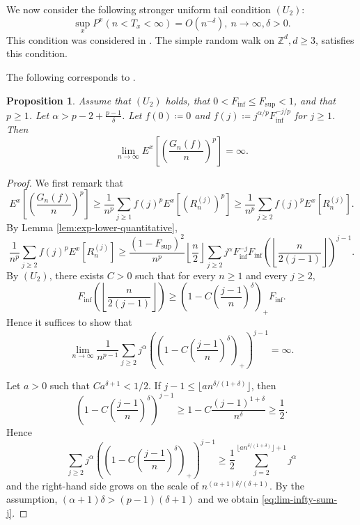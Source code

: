 \documentclass[a4paper, reqno, 11pt]{amsart}
\newtheorem{Prop}[Thm]{Proposition}
\theoremstyle{definition}
\begin{document}
We now consider the following stronger uniform tail  condition $(U_2)$: 
\[ \sup_{x} P^x (n < T_x < \infty) = O(n^{-\delta}), \ n \to \infty, \delta > 0. \]
This condition was considered in \cite[Proposition 5.7]{KN2018}. 
The simple random walk on $\mathbb{Z}^d, d \ge 3$, satisfies this condition. 

The following corresponds to \cite[Remark 3]{CCMP2026}. 
\begin{Prop}\label{prop:Lp-explode}
Assume that $(U_2)$ holds, that $0 < F_{\inf} \le F_{\sup} < 1$, and that $p \ge 1$. 
Let  $\alpha > p-2 + \frac{p-1}{\delta}$. 
Let $f(0) \coloneqq 0$ and $f(j) \coloneqq j^{\alpha/p} F_{\inf}^{- j/p}$ for $j \ge 1$. 
Then 
\[ \lim_{n \to \infty} E^x \left[ \left( \frac{G_n (f)}{n} \right)^p \right] = \infty. \]
\end{Prop}


\begin{proof}
We first remark that 
\[ E^x \left[ \left( \frac{G_n (f)}{n} \right)^p \right] \ge \frac{1}{n^p} \sum_{j \ge 1} f(j)^p E^x \left[\left(R_n^{(j)}\right)^p\right] \ge \frac{1}{n^p} \sum_{j \ge 2} f(j)^p E^x \left[R_n^{(j)}\right]. \]
By Lemma \ref{lem:exp-lower-quantitative}, 
\[ \frac{1}{n^p} \sum_{j \ge 2} f(j)^p E^x \left[R_n^{(j)}\right] \ge \frac{(1-F_{\sup})^2}{n^p}   \left\lfloor \frac{n}{2} \right\rfloor \sum_{j \ge 2}  j^{\alpha} F_{\inf}^{-j} F_{\inf}\left( \left\lfloor \frac{n}{2(j-1)} \right\rfloor\right)^{j-1}. \]
By  $(U_2)$, 
there exists $C > 0$ such that for every $n \ge 1$ and every $j \ge 2$, 
\[ F_{\inf}\left( \left\lfloor \frac{n}{2(j-1)} \right\rfloor\right) \ge  \left(1 - C \left(\frac{j-1}{n}\right)^{\delta}\right)_{+}  F_{\inf}. \]
Hence it suffices to show that 
\begin{equation}\label{eq:lim-infty-sum-j}
\lim_{n \to \infty} \frac{1}{n^{p-1}} \sum_{j \ge 2} j^{\alpha} \left(\left(1 - C \left(\frac{j-1}{n}\right)^{\delta}\right)_{+}\right)^{j-1} = \infty. 
\end{equation}

Let $a > 0$ such that $C a^{\delta + 1} < 1/2$. 
If $j - 1 \le \lfloor a n^{\delta/(1+\delta)} \rfloor$, then 
\[ \left(1 - C \left(\frac{j-1}{n}\right)^{\delta}\right)^{j-1}  \ge 1 - C \frac{(j-1)^{1+\delta}}{n^{\delta}} \ge \frac{1}{2}. \]
Hence
\[ \sum_{j \ge 2} j^{\alpha} \left(\left(1 - C \left(\frac{j-1}{n}\right)^{\delta}\right)_{+}\right)^{j-1} \ge \frac{1}{2} \sum_{j=2}^{\lfloor a n^{\delta/(1+\delta)} \rfloor + 1} j^{\alpha}  \]
and the right-hand side grows on the scale of $n^{(\alpha + 1) \delta / (\delta + 1)}$. 
By the assumption, $(\alpha + 1) \delta >  (p-1) (\delta + 1)$ and we obtain \eqref{eq:lim-infty-sum-j}. 
\end{proof}
\end{document}
